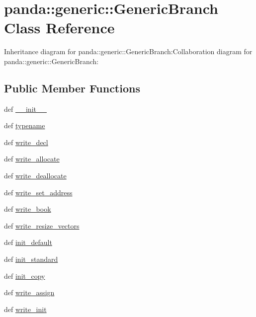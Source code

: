 \hypertarget{classpanda_1_1generic_1_1GenericBranch}{
\section{panda::generic::GenericBranch Class Reference}
\label{classpanda_1_1generic_1_1GenericBranch}
}
Inheritance diagram for panda::generic::GenericBranch:Collaboration diagram for panda::generic::GenericBranch:\subsection*{Public Member Functions}
\begin{DoxyCompactItemize}
\item 
def \hyperlink{classpanda_1_1generic_1_1GenericBranch_ad1236b35769c2d88646b49b013ad070d}{\_\-\_\-init\_\-\_\-}
\item 
def \hyperlink{classpanda_1_1generic_1_1GenericBranch_af78008825777e7935f92b45facbf6d54}{typename}
\item 
def \hyperlink{classpanda_1_1generic_1_1GenericBranch_a21550a6ea551dc0bd68b730c2f8d62f9}{write\_\-decl}
\item 
def \hyperlink{classpanda_1_1generic_1_1GenericBranch_a67d440a62e13258d4731e7196db2f4f0}{write\_\-allocate}
\item 
def \hyperlink{classpanda_1_1generic_1_1GenericBranch_a455c3bc1f6dfbf0d00e5a68f8e79bd27}{write\_\-deallocate}
\item 
def \hyperlink{classpanda_1_1generic_1_1GenericBranch_a20f25a66829884ef5bf77f8a7bd06c42}{write\_\-set\_\-address}
\item 
def \hyperlink{classpanda_1_1generic_1_1GenericBranch_ab14b2d4bccc10621173e87c9ae95e8c2}{write\_\-book}
\item 
def \hyperlink{classpanda_1_1generic_1_1GenericBranch_a63ead987de9ee2075c2ca202c6b7c129}{write\_\-resize\_\-vectors}
\item 
def \hyperlink{classpanda_1_1generic_1_1GenericBranch_a2e31ded0f3f62fbbbb8fc73707793b8d}{init\_\-default}
\item 
def \hyperlink{classpanda_1_1generic_1_1GenericBranch_aef90d8609c13cd7bd67f557746674a8c}{init\_\-standard}
\item 
def \hyperlink{classpanda_1_1generic_1_1GenericBranch_a1f0289b699c648c6e795d7f61a79b45f}{init\_\-copy}
\item 
def \hyperlink{classpanda_1_1generic_1_1GenericBranch_a4f5d6de742225769443beb17bda74a4d}{write\_\-assign}
\item 
def \hyperlink{classpanda_1_1generic_1_1GenericBranch_a202afea2ac9cb487881dc7146d4a523b}{write\_\-init}
\end{DoxyCompactItemize}
